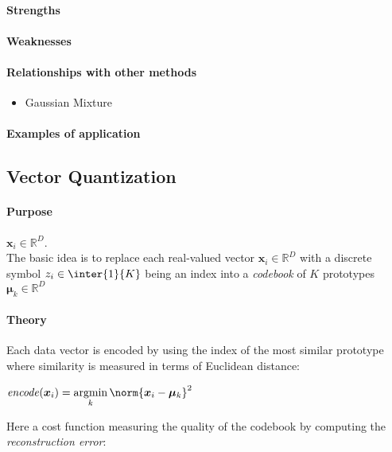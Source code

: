 \paragraph{Strengths}
\paragraph{Weaknesses}
\paragraph{Relationships with other methods}
\begin{itemize}
    \item Gaussian Mixture
\end{itemize}

\paragraph{Examples of application}


\subsection{Vector Quantization}
\paragraph{Purpose}
$\bm{x}_{i}\in\mathbb{R}^{D}$.\\
The basic idea is to replace each real-valued vector $\bm{x}_{i}\in\mathbb{R}^{D}$ with a discrete
symbol $z_{i}\in\inter{1}{K}$ being an index into a \emph{codebook} of $K$ prototypes $\bm{\mu}_{k}
\in\mathbb{R}^{D}$
\paragraph{Theory}
Each data vector is encoded by using the index of the most similar prototype where similarity is
measured in terms of Euclidean distance:
\begin{center}
    $\text{\emph{encode}}(\bm{x}_{i}) = \displaystyle\argmin_{k}\norm{\bm{x}_{i}-\bm{\mu}_{k}}^{2}$
\end{center}
Here a cost function measuring the quality of the codebook by computing the \emph{reconstruction
error}:
\begin{center}
\end{center}

